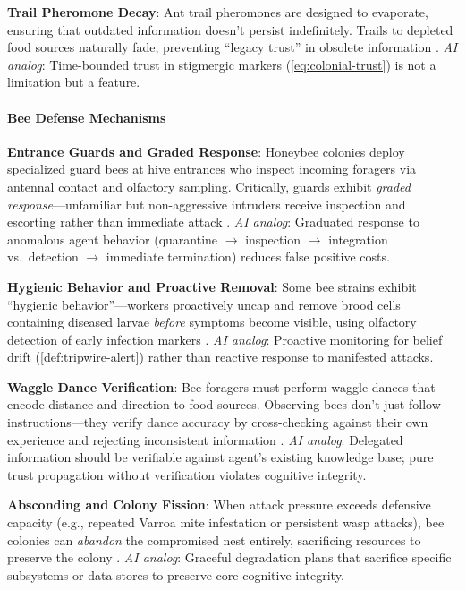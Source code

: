\documentclass[
]{article}
\begin{document}
\textbf{Trail Pheromone Decay}: Ant trail pheromones are designed to
evaporate, ensuring that outdated information doesn't persist
indefinitely. Trails to depleted food sources naturally fade, preventing
``legacy trust'' in obsolete information
\citep{jackson2006communication}. \emph{AI analog}: Time-bounded trust
in stigmergic markers (\cref{eq:colonial-trust}) is not a limitation but
a feature.

\paragraph{Bee Defense Mechanisms}\label{sec:bee-defenses}

\textbf{Entrance Guards and Graded Response}: Honeybee colonies deploy
specialized guard bees at hive entrances who inspect incoming foragers
via antennal contact and olfactory sampling. Critically, guards exhibit
\emph{graded response}---unfamiliar but non-aggressive intruders receive
inspection and escorting rather than immediate attack
\citep{breed2004division}. \emph{AI analog}: Graduated response to
anomalous agent behavior (quarantine \texorpdfstring{\ensuremath{\to}}{->} inspection \texorpdfstring{\ensuremath{\to}}{->} integration
vs.~detection \texorpdfstring{\ensuremath{\to}}{->} immediate termination) reduces false positive costs.

\textbf{Hygienic Behavior and Proactive Removal}: Some bee strains
exhibit ``hygienic behavior''---workers proactively uncap and remove
brood cells containing diseased larvae \emph{before} symptoms become
visible, using olfactory detection of early infection markers
\citep{spivak2001hygienic}. \emph{AI analog}: Proactive monitoring for
belief drift (\cref{def:tripwire-alert}) rather than reactive response
to manifested attacks.

\textbf{Waggle Dance Verification}: Bee foragers must perform waggle
dances that encode distance and direction to food sources. Observing
bees don't just follow instructions---they verify dance accuracy by
cross-checking against their own experience and rejecting inconsistent
information \citep{gruter2008dance}. \emph{AI analog}: Delegated
information should be verifiable against agent's existing knowledge
base; pure trust propagation without verification violates cognitive
integrity.

\textbf{Absconding and Colony Fission}: When attack pressure exceeds
defensive capacity (e.g., repeated Varroa mite infestation or persistent
wasp attacks), bee colonies can \emph{abandon} the compromised nest
entirely, sacrificing resources to preserve the colony
\citep{schneider2001economics}. \emph{AI analog}: Graceful degradation
plans that sacrifice specific subsystems or data stores to preserve core
cognitive integrity.
\end{document}
